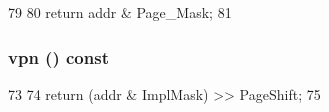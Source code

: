 \begin{DoxyCode}
79     {
80         return addr & Page_Mask;
81     }
\end{DoxyCode}
\hypertarget{structPowerISA_1_1VAddr_ab81a86f36291439a60bf57c10ae767f4}{
\subsubsection[{vpn}]{ vpn () const}}
\label{structPowerISA_1_1VAddr_ab81a86f36291439a60bf57c10ae767f4}



\begin{DoxyCode}
73     {
74         return (addr & ImplMask) >> PageShift;
75     }
\end{DoxyCode}


